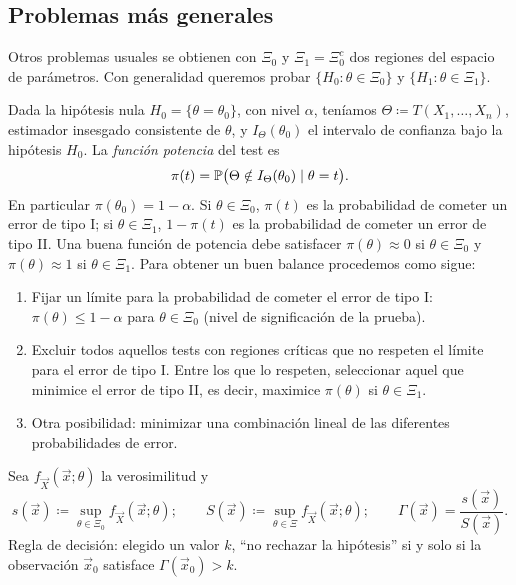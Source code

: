 \textcolor{azulresalt}{
\section{Problemas más generales}
Otros problemas usuales se obtienen con $\Xi_0$ y $\Xi_1 = \Xi_0^c$ dos regiones del espacio de parámetros. Con generalidad queremos probar $\{H_0 : \theta \in \Xi_0\}$ y $\{H_1 : \theta \in \Xi_1\}$.
\begin{definicion}[80]
Dada la hipótesis nula $H_0 = \{\theta = \theta_0\}$, con nivel $\alpha$, teníamos $\Theta \coloneqq T(X_1, \dots, X_n)$, estimador insesgado consistente de $\theta$, y $I_\Theta(\theta_0)$ el intervalo de confianza bajo la hipótesis $H_0$. La \emph{función potencia} del test es
\[
  \pi(t) = \mathbb{P}\bigl(\Theta \notin I_\Theta(\theta_0) \mid \theta = t\bigr).
\]
En particular $\pi(\theta_0) = 1 - \alpha$. Si $\theta \in \Xi_0$, $\pi(t)$ es la probabilidad de cometer un error de tipo I; si $\theta \in \Xi_1$, $1 - \pi(t)$ es la probabilidad de cometer un error de tipo II. Una buena función de potencia debe satisfacer $\pi(\theta) \approx 0$ si $\theta \in \Xi_0$ y $\pi(\theta) \approx 1$ si $\theta \in \Xi_1$. Para obtener un buen balance procedemos como sigue:
\begin{enumerate}
  \item Fijar un límite para la probabilidad de cometer el error de tipo I: $\pi(\theta) \le 1 - \alpha$ para $\theta \in \Xi_0$ (nivel de significación de la prueba).
  \item Excluir todos aquellos tests con regiones críticas que no respeten el límite para el error de tipo I. Entre los que lo respeten, seleccionar aquel que minimice el error de tipo II, es decir, maximice $\pi(\theta)$ si $\theta \in \Xi_1$.
  \item Otra posibilidad: minimizar una combinación lineal de las diferentes probabilidades de error.
\end{enumerate}
\end{definicion}
\begin{definicion}
Sea $f_{\vec{X}}(\vec{x};\theta)$ la verosimilitud y
\[
  s(\vec{x}) \coloneqq \sup_{\theta \in \Xi_0} f_{\vec{X}}(\vec{x};\theta); \qquad S(\vec{x}) \coloneqq \sup_{\theta \in \Xi} f_{\vec{X}}(\vec{x};\theta); \qquad \Gamma(\vec{x}) = \frac{s(\vec{x})}{S(\vec{x})}.
\]
Regla de decisión: elegido un valor $k$, ``no rechazar la hipótesis'' si y solo si la observación $\vec{x}_0$ satisface $\Gamma(\vec{x}_0) > k$.
\end{definicion}
}
